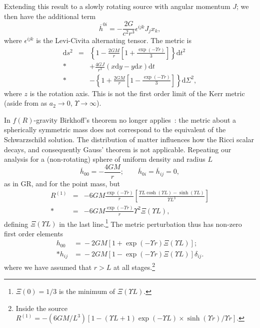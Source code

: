 \documentclass[aps,prd,amsfonts,amssymb,amsmath,nofootinbib,reprint,showpacs]{revtex4-1}
\newcommand{\dd}{\ensuremath{\text{d}}}
\begin{document}
Extending this result to a slowly rotating source with angular momentum $J$; we then have the additional term~\cite{Hobson2006}
\begin{equation}
\overline{h}^{0i} = -\frac{2G}{c^2r^3} \epsilon^{ijk}J_j x_k,
\end{equation}
where $\epsilon^{ijk}$ is the Levi-Civita alternating tensor. The metric is
\begin{eqnarray}
\dd s^2 & = & \left\{1-\frac{2GM}{r}\left[1 + \frac{\exp(- \Upsilon r)}{3}\right]\right\}\dd t^2 \nonumber \\*
& & + {} \frac{4GJ}{r^3}\left(x\dd y - y\dd x\right)\dd t \nonumber \\*
& & - {} \left\{1 +\frac{2GM}{r}\left[1 - \frac{\exp(- \Upsilon r)}{3}\right]\right\}\dd \Sigma^2,\label{eq:f(R)_Kerr}
\end{eqnarray}
where $z$ is the rotation axis. This is not the first order limit of the Kerr metric (aside from as $a_2 \rightarrow 0$, $\Upsilon \rightarrow \infty$).

In $f(R)$-gravity Birkhoff's theorem no longer applies~\cite{Pechlaner1966, Stelle1978, Clifton2006, Capozziello2009b, Stabile2010}: the metric about a spherically symmetric mass does not correspond to the equivalent of the Schwarzschild solution. The distribution of matter influences how the Ricci scalar decays, and consequently Gauss' theorem is not applicable. Repeating our analysis for a (non-rotating) sphere of uniform density and radius $L$
\begin{equation}
\overline{h}_{00} = -\frac{4GM}{r}; \qquad \overline{h}_{0i} = \overline{h}_{ij} = 0,
\end{equation}
as in GR, and for the point mass, but
\begin{eqnarray}
R^{(1)} & = & -6 G M \frac{\exp(- \Upsilon r)}{r}\left[\frac{\Upsilon L\cosh(\Upsilon L) - \sinh(\Upsilon L)}{\Upsilon L^3}\right] \nonumber \\*
 & = &  -6 G M \frac{\exp(- \Upsilon r)}{r}\Upsilon^2\Xi(\Upsilon L),
\end{eqnarray}
defining $\Xi(\Upsilon L)$ in the last line.\footnote{$\Xi(0) = 1/3$ is the minimum of $\Xi(\Upsilon L)$.} The metric perturbation thus has non-zero first order elements~\cite{Stelle1978, Capozziello2009b, Stabile2010}
\begin{equation}
\begin{split}
h_{00} & = {} -2 G M \left[1 + \exp(- \Upsilon r)\Xi(\Upsilon L)\right]; \\*
h_{ij} & = {} -2 G M \left[1 - \exp(- \Upsilon r)\Xi(\Upsilon L)\right]\delta_{ij}.
\label{eq:Uniform}
\end{split}
\end{equation}
where we have assumed that $r > L$ at all stages.\footnote{Inside the source $R^{(1)} = -{(6 G M/{L^3})}[1 - (\Upsilon L + 1)\exp(-\Upsilon L) \times\sinh(\Upsilon r)/\Upsilon r]$.}
\end{document}
